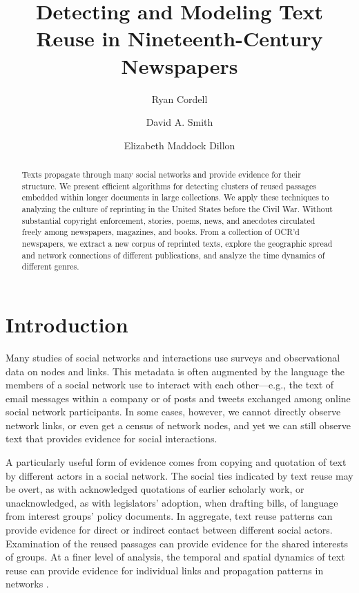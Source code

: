 \documentclass[pdftex,11pt]{article}
\begin{document}
\title{Detecting and Modeling Text Reuse in Nineteenth-Century Newspapers}

\author{Ryan Cordell \and David A. Smith \and Elizabeth Maddock Dillon}

\date{}

\maketitle


\begin{abstract}
  Texts propagate through many social networks and provide evidence
  for their structure.  We present efficient algorithms for detecting
  clusters of reused passages embedded within longer documents in
  large collections.  We apply these techniques to analyzing the
  culture of reprinting in the United States before the Civil War.
  Without substantial copyright enforcement, stories, poems, news, and
  anecdotes circulated freely among newspapers, magazines, and books.
  From a collection of OCR'd newspapers, we extract a new corpus of
  reprinted texts, explore the geographic spread and network
  connections of different publications, and analyze the time dynamics
  of different genres.
\end{abstract}

\section{Introduction}
\label{sec:intro}

Many studies of social networks and interactions use surveys and
observational data on nodes and links.  This metadata is often
augmented by the language the members of a social network use to
interact with each other---e.g., the text of email messages within a
company or of posts and tweets exchanged among online social network
participants.  In some cases, however, we cannot directly observe
network links, or even get a census of network nodes, and yet we can
still observe text that provides evidence for social interactions.

A particularly useful form of evidence comes from copying and
quotation of text by different actors in a social network.  The social
ties indicated by text reuse may be overt, as with acknowledged
quotations of earlier scholarly work, or unacknowledged, as with
legislators' adoption, when drafting bills, of language from interest
groups' policy documents.  In aggregate, text reuse patterns can
provide evidence for direct or indirect contact between different
social actors.  Examination of the reused passages can provide
evidence for the shared interests of groups.  At a finer level of
analysis, the temporal and spatial dynamics of text reuse can provide
evidence for individual links and propagation patterns in networks
\cite{leskovec09:_meme_dynam_news_cycle,lease12:_findin_explor_memes_social_media}.
\end{document}
